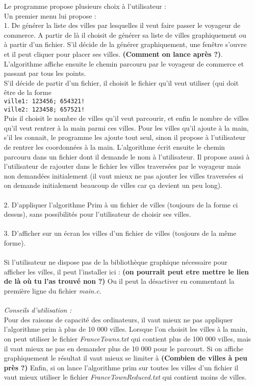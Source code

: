 \documentclass[a4paper,11pt]{article}
\begin{document}
Le programme propose plusieurs choix à l'utilisateur :\\
Un premier menu lui propose :\\
1. De générer la liste des villes par lesquelles il veut faire passer le voyageur de commerce.
A partir de là il choisit de générer sa liste de villes graphiquement ou à partir d'un fichier. S'il décide de la générer graphiquement, une fenêtre s'ouvre et il peut cliquer pour placer ses villes. {\large \textbf{(Comment on lance après ?)}}. L'algorithme affiche ensuite le chemin parcouru par le voyageur de commerce et passant par tous les points.\\
S'il décide de partir d'un fichier, il choisit le fichier qu'il veut utiliser (qui doit être de la forme \\
\texttt{ville1: 123456; 654321!}\\
\texttt{ville2: 123458; 657521!}\\
Puis il choisit le nombre de villes qu'il veut parcourir, et enfin le nombre de villes qu'il veut rentrer à la main parmi ces villes. Pour les villes qu'il ajoute à la main, s'il les connait, le programme les ajoute tout seul, sinon il propose à l'utilisateur de rentrer les coordonnées à la main. L'algorithme écrit ensuite le chemin parcouru dans un fichier dont il demande le nom à l'utilisateur. Il propose aussi à l'utilisateur de rajouter dans le fichier les villes traversées par le voyageur mais non demandées initialement (il vaut mieux ne pas ajouter les villes traversées si on demande initialement beaucoup de villes car ça devient un peu long).\\
\\
2. D'appliquer l'algorithme Prim à un fichier de villes (toujours de la forme ci dessus), sans possibilités pour l'utilisateur de choisir ses villes.\\
\\
3. D'afficher sur un écran les villes d'un fichier de villes (toujours de la même forme).\\
\\
Si l'utilisateur ne dispose pas de la bibliothèque graphique nécessaire pour afficher les villes, il peut l'installer ici : {\large \textbf{(on pourrait peut etre mettre le lien de là où tu l'as trouvé non ?)}} Ou il peut la désactiver en commentant la première ligne du fichier \textit{main.c}.\\
\\
\textit{Conseils d'utilisation : }\\
Pour des raisons de capacité des ordinateurs, il vaut mieux ne pas appliquer l'algorithme prim à plus de 10 000 villes.
Lorsque l'on choisit les villes à la main, on peut utiliser le fichier \textit{FranceTowns.txt} qui contient plus de 100 000 villes, mais il vaut mieux ne pas en demander plus de 10 000 pour le parcourt.
Si on affiche graphiquement le résultat il vaut mieux se limiter à {\Large \textbf{(Combien de villes à peu près ?)}}
Enfin, si on lance l'algorithme prim sur toutes les villes d'un fichier il vaut mieux utiliser le fichier \textit{FranceTownReduced.txt} qui contient moins de villes.
\end{document}
